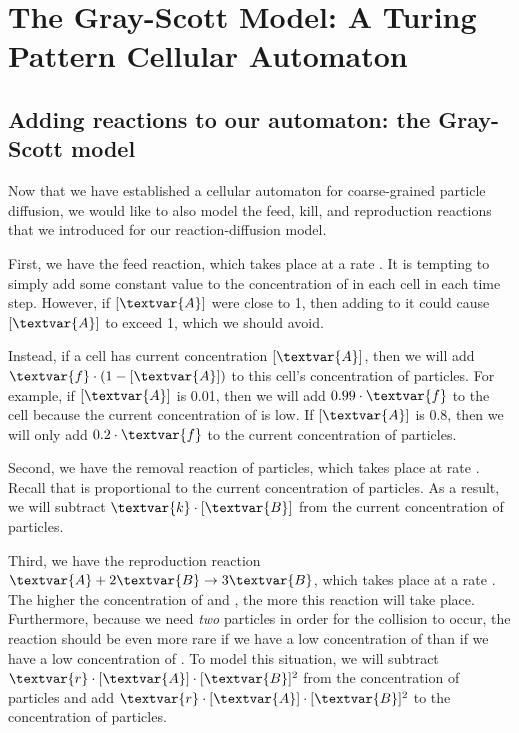 \FloatBarrier
{}
\section{The Gray-Scott Model: A Turing Pattern Cellular Automaton}
\label{sec:the_gray-scott_model:_a_turing_pattern_cellular_automaton}

\FloatBarrier
{}
\subsection{Adding reactions to our automaton: the Gray-Scott model}

Now that we have established a cellular automaton for coarse-grained particle diffusion, we would like to also model the feed, kill, and reproduction reactions that we introduced for our reaction-diffusion model.\\

\begin{qbox}\end{qbox}

First, we have the feed reaction, which takes place at a rate . It is tempting to simply add some constant value  to the concentration of  in each cell in each time step. However, if $[\textvar{A}]$ were close to 1, then adding  to it could cause $[\textvar{A}]$ to exceed 1, which we should avoid.

Instead, if a cell has current concentration $[\textvar{A}]$, then we will add $\textvar{f} \cdot (1-[\textvar{A}])$ to this cell's concentration of  particles. For example, if $[\textvar{A}]$ is 0.01, then we will add $0.99 \cdot \textvar{f}$ to the cell because the current concentration of is low. If $[\textvar{A}]$ is 0.8, then we will only add $0.2 \cdot \textvar{f}$ to the current concentration of  particles.

Second, we have the removal reaction of  particles, which takes place at rate . Recall that  is proportional to the current concentration of  particles. As a result, we will subtract $\textvar{k} \cdot [\textvar{B}]$ from the current concentration of  particles.

Third, we have the reproduction reaction $\textvar{A} + 2\textvar{B} \rightarrow 3\textvar{B}$, which takes place at a rate . The higher the concentration of  and , the more this reaction will take place. Furthermore, because we need \textit{two}  particles in order for the collision to occur, the reaction should be even more rare if we have a low concentration of  than if we have a low concentration of . To model this situation, we will subtract $\textvar{r} \cdot [\textvar{A}] \cdot [\textvar{B}]^2$ from the concentration of  particles and add $\textvar{r} \cdot [\textvar{A}] \cdot [\textvar{B}]^2$ to the concentration of  particles.

